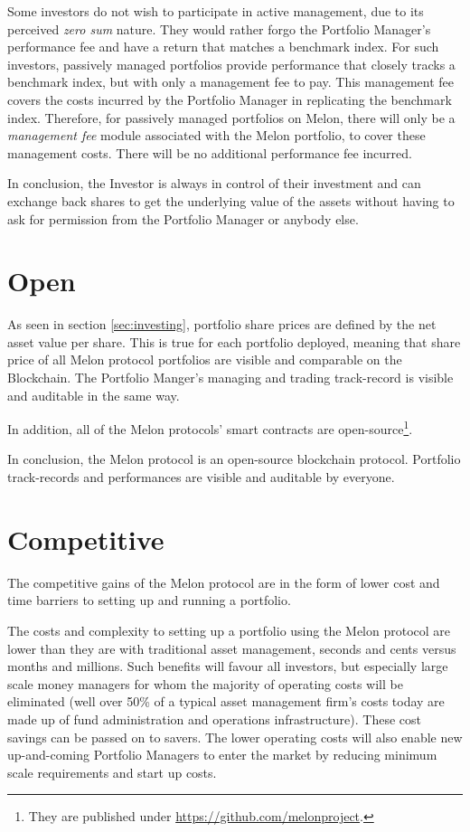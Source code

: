 \documentclass[9pt,oneside]{amsart}
\theoremstyle{plain}
\begin{document}
\begin{multicols}{2}
Some investors do not wish to participate in active management, due to its perceived \textit{zero sum} nature\cite{sharpe}. They would rather forgo the Portfolio Manager's performance fee and have a return that matches a benchmark index. For such investors, passively managed portfolios provide performance that closely tracks a benchmark index, but with only a management fee to pay. This management fee covers the costs incurred by the Portfolio Manager in replicating the benchmark index. Therefore, for passively managed portfolios on Melon, there will only be a \textit{management fee} module associated with the Melon portfolio, to cover these management costs. There will be no additional performance fee incurred.

In conclusion, the Investor is always in control of their investment and can exchange back shares to get the underlying value of the assets without having to ask for permission from the Portfolio Manager or anybody else.

\section{Open}\label{sec:open}

As seen in section \ref{sec:investing}, portfolio share prices are defined by the net asset value per share. This is true for each portfolio deployed, meaning that share price of all Melon protocol portfolios are visible and comparable on the Blockchain. The Portfolio Manger's managing and trading track-record is visible and auditable in the same way.

In addition, all of the Melon protocols' smart contracts are open-source\footnote{They are published under \url{https://github.com/melonproject}.}. 

In conclusion, the Melon protocol is an open-source blockchain protocol. Portfolio track-records and performances are visible and auditable by everyone.

\section{Competitive}\label{sec:competitive}

The competitive gains of the Melon protocol are in the form of lower cost and time barriers to setting up and running a portfolio.

The costs and complexity to setting up a portfolio using the Melon protocol are lower than they are with traditional asset management, seconds and cents versus months and millions. Such benefits will favour all investors, but especially large scale money managers for whom the majority of operating costs will be eliminated (well over 50\% of a typical asset management firm’s costs today are made up of fund administration and operations infrastructure\cite{kpmg}). These cost savings can be passed on to savers. The lower operating costs will also enable new up-and-coming Portfolio Managers to enter the market by reducing minimum scale requirements and start up costs.


\end{multicols}
\end{document}
